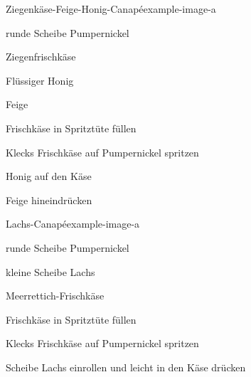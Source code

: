 




\begin{recipe}{Ziegenkäse-Feige-Honig-Canapé}{example-image-a}{
    \item[1] runde Scheibe Pumpernickel
    \item[1 TL] Ziegenfrischkäse
    \item[Etwas] Flüssiger Honig
    \item[\sfrac{1}{8}] Feige
  }

  \item Frischkäse in Spritztüte füllen
  \item Klecks Frischkäse auf Pumpernickel spritzen
  \item Honig auf den Käse
  \item Feige hineindrücken
\end{recipe}


\begin{recipe}{Lachs-Canapé}{example-image-a}{
    \item[1] runde Scheibe Pumpernickel
    \item[1] kleine Scheibe Lachs
    \item[1] Meerrettich-Frischkäse
  }

  \item Frischkäse in Spritztüte füllen
  \item Klecks Frischkäse auf Pumpernickel spritzen
  \item Scheibe Lachs einrollen und leicht in den Käse drücken
\end{recipe}


